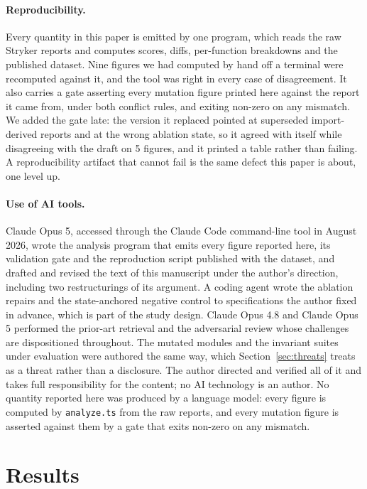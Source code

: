 \documentclass[12pt]{article}
\begin{document}
\paragraph{Reproducibility.} Every quantity in this paper is emitted by one
program, which reads the raw Stryker reports and computes scores, diffs,
per-function breakdowns and the published dataset. Nine figures we had computed by
hand off a terminal were recomputed against it, and the tool was right in every case
of disagreement. It also carries a gate asserting every mutation figure printed here against
the report it came from, under both conflict rules, and exiting non-zero on any
mismatch. We added the gate late: the version it replaced pointed at superseded
import-derived reports and at the wrong ablation state, so it agreed with itself
while disagreeing with the draft on 5 figures, and it printed a table rather than
failing. A reproducibility artifact that cannot fail is the same defect this paper is
about, one level up.

\paragraph{Use of AI tools.} Claude Opus 5, accessed through the Claude Code
command-line tool in August 2026, wrote the analysis program that emits every
figure reported here, its validation gate and the reproduction script published
with the dataset, and drafted and revised the text of this manuscript under the
author's direction, including two restructurings of its argument. A coding agent
wrote the ablation repairs and the state-anchored negative control to
specifications the author fixed in advance, which is part of the study design. Claude Opus 4.8 and Claude Opus 5 performed
the prior-art retrieval and the adversarial review whose challenges are
dispositioned throughout. The mutated modules and the invariant suites under
evaluation were authored the same way, which Section~\ref{sec:threats} treats as a
threat rather than a disclosure. The author directed and verified all of it and
takes full responsibility for the content; no AI technology is an author. No
quantity reported here was produced by a language model: every figure is computed
by \texttt{analyze.ts} from the raw reports, and every mutation figure is asserted
against them by a gate that exits non-zero on any mismatch.

\section{Results}
\label{sec:results}
\end{document}

